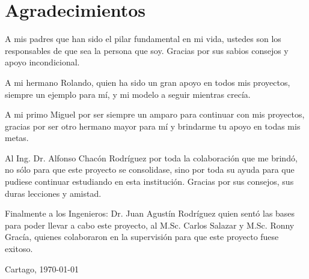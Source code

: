 \chapter*{Agradecimientos}
\thispagestyle{empty}

A mis padres que han sido el pilar fundamental en mi vida, ustedes son los responsables de que sea la persona que soy. Gracias por sus sabios consejos y apoyo incondicional.

A mi hermano Rolando, quien ha sido un gran apoyo en todos mis proyectos, siempre un ejemplo para mí, y mi modelo a seguir mientras crecía.

A mi primo Miguel por ser siempre un amparo para continuar con mis proyectos, gracias por ser otro hermano mayor para mí y brindarme tu apoyo en todas mis metas.

Al Ing. Dr. Alfonso Chacón Rodríguez por toda la colaboración que me brindó, no sólo para que este proyecto se consolidase, sino por toda su ayuda para que pudiese continuar estudiando en esta institución. Gracias por sus consejos, sus duras lecciones y amistad.

Finalmente a los Ingenieros: Dr.  Juan Agustín Rodríguez quien sentó las bases para poder llevar a cabo este proyecto, al M.Sc. Carlos Salazar y M.Sc. Ronny Gracía, quienes colaboraron en la supervisión para que este proyecto fuese exitoso.







\vspace*{1cm}

\scriptAuthor

Cartago, \today

\cleardoublepage

